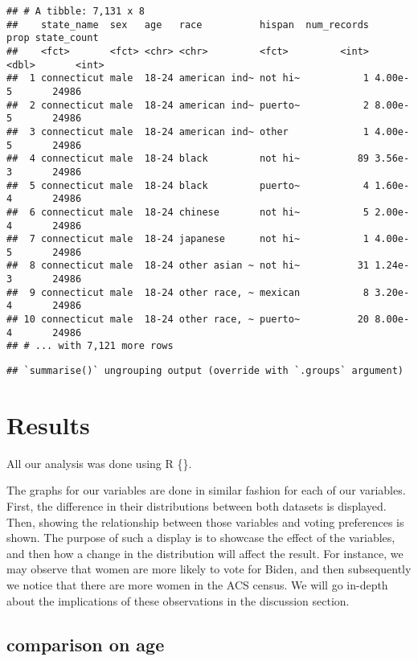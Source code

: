 \documentclass[
]{article}
\begin{document}
\begin{verbatim}
## # A tibble: 7,131 x 8
##    state_name  sex   age   race          hispan  num_records    prop state_count
##    <fct>       <fct> <chr> <chr>         <fct>         <int>   <dbl>       <int>
##  1 connecticut male  18-24 american ind~ not hi~           1 4.00e-5       24986
##  2 connecticut male  18-24 american ind~ puerto~           2 8.00e-5       24986
##  3 connecticut male  18-24 american ind~ other             1 4.00e-5       24986
##  4 connecticut male  18-24 black         not hi~          89 3.56e-3       24986
##  5 connecticut male  18-24 black         puerto~           4 1.60e-4       24986
##  6 connecticut male  18-24 chinese       not hi~           5 2.00e-4       24986
##  7 connecticut male  18-24 japanese      not hi~           1 4.00e-5       24986
##  8 connecticut male  18-24 other asian ~ not hi~          31 1.24e-3       24986
##  9 connecticut male  18-24 other race, ~ mexican           8 3.20e-4       24986
## 10 connecticut male  18-24 other race, ~ puerto~          20 8.00e-4       24986
## # ... with 7,121 more rows
\end{verbatim}

\begin{verbatim}
## `summarise()` ungrouping output (override with `.groups` argument)
\end{verbatim}

\hypertarget{results}{%
\section{Results}\label{results}}

All our analysis was done using R \{\citet{CiteR}\}.

The graphs for our variables are done in similar fashion for each of our variables. First, the difference in their distributions between both datasets is displayed. Then, showing the relationship between those variables and voting preferences is shown. The purpose of such a display is to showcase the effect of the variables, and then how a change in the distribution will affect the result. For instance, we may observe that women are more likely to vote for Biden, and then subsequently we notice that there are more women in the ACS census. We will go in-depth about the implications of these observations in the discussion section.

\hypertarget{comparison-on-age}{%
\subsection{comparison on age}\label{comparison-on-age}}
\end{document}
